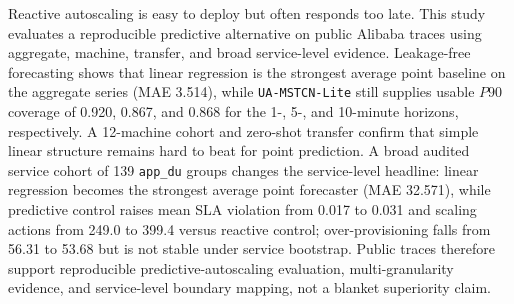 Reactive autoscaling is easy to deploy but often responds too late. This study evaluates a reproducible predictive alternative on public Alibaba traces using aggregate, machine, transfer, and broad service-level evidence. Leakage-free forecasting shows that linear regression is the strongest average point baseline on the aggregate series (MAE 3.514), while \texttt{UA-MSTCN-Lite} still supplies usable $P90$ coverage of 0.920, 0.867, and 0.868 for the 1-, 5-, and 10-minute horizons, respectively. A 12-machine cohort and zero-shot transfer confirm that simple linear structure remains hard to beat for point prediction. A broad audited service cohort of 139 \texttt{app\_du} groups changes the service-level headline: linear regression becomes the strongest average point forecaster (MAE 32.571), while predictive control raises mean SLA violation from 0.017 to 0.031 and scaling actions from 249.0 to 399.4 versus reactive control; over-provisioning falls from 56.31 to 53.68 but is not stable under service bootstrap. Public traces therefore support reproducible predictive-autoscaling evaluation, multi-granularity evidence, and service-level boundary mapping, not a blanket superiority claim.
